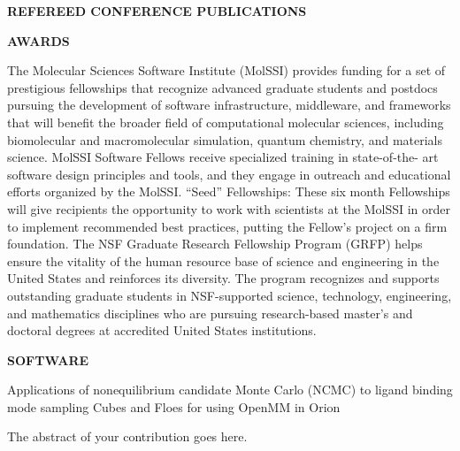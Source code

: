 {  
  
\vspace{12pt}
\textbf{REFEREED CONFERENCE PUBLICATIONS}


  
\vspace{12pt}
\textbf{AWARDS}

  {The Molecular Sciences Software Institute (MolSSI) provides funding for a set of prestigious fellowships that recognize advanced graduate students and postdocs pursuing the development of software infrastructure, middleware, and frameworks that will benefit the broader field of computational molecular sciences, including biomolecular and macromolecular simulation, quantum chemistry, and materials science. MolSSI Software Fellows receive specialized training in state-of-the- art software design principles and tools, and they engage in outreach and educational efforts organized by the MolSSI.}
  {“Seed” Fellowships: These six month Fellowships will give recipients the opportunity to work with scientists at the MolSSI in order to implement recommended best practices, putting the Fellow’s project on a firm foundation.}
  {The NSF Graduate Research Fellowship Program (GRFP) helps ensure the vitality of the human resource base of science and engineering in the United States and reinforces its diversity. The program recognizes and supports outstanding graduate students in NSF-supported science, technology, engineering, and mathematics disciplines who are pursuing research-based master's and doctoral degrees at accredited United States institutions.}
  
\vspace{12pt}
\textbf{SOFTWARE}

  {Applications of nonequilibrium candidate Monte Carlo (NCMC) to ligand binding mode sampling}
  {Cubes and Floes for using OpenMM in Orion}
  

}

\thesisabstract
{
  The abstract of your contribution goes here.
}


